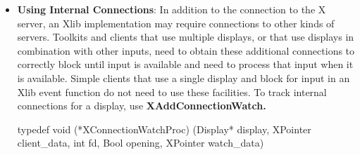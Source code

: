 \documentclass{report}
\begin{document}
\begin{itemize}
            \bigbreak \noindent 
            To unlock a display, use XUnlockDisplay
            \bigbreak \noindent 
            \begin{cppcode}
            void XUnlockDisplay(display)
            \end{cppcode}
            \bigbreak \noindent 
            The \textbf{XUnlockDisplay} function allows other threads to use the specified display again. Any threads that have blocked on the display are allowed to continue. Nested locking works correctly; if \textbf{XLockDisplay} has been called multiple times by a thread, then \textbf{XUnlockDisplay} must be called an equal number of times before the display is actually unlocked. This function has no effect unless Xlib was successfully initialized for threads using \textbf{XInitThreads.}
        \item \textbf{Using Internal Connections}: In addition to the connection to the X server, an Xlib implementation may require connections to other kinds of servers. Toolkits and clients that use multiple displays, or that use displays in combination with other inputs, need to obtain these additional connections to correctly block until input is available and need to process that input when it is available. Simple clients that use a single display and block for input in an Xlib event function do not need to use these facilities.
            \bigbreak \noindent 
            To track internal connections for a display, use \textbf{XAddConnectionWatch.}
            \bigbreak \noindent 
            \begin{cppcode}
                typedef void (*XConnectionWatchProc) (Display* display, XPointer client_data, int fd, Bool opening, XPointer watch_data)


\end{cppcode}
\end{itemize}
\end{document}
